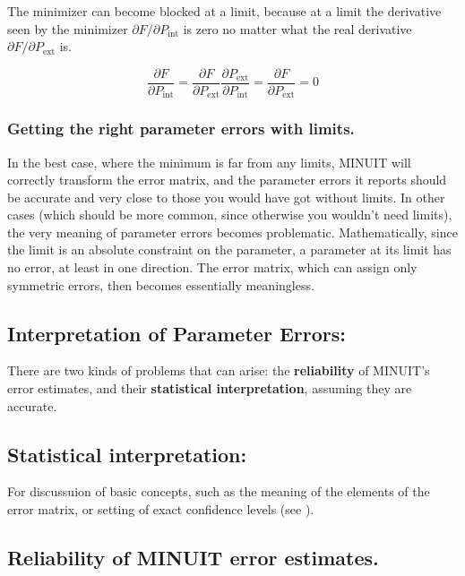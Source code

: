 The minimizer can become blocked at a limit, because at a limit
the derivative seen by the minimizer 
$\partial F / \partial P_{\mathrm{int}}$
is zero no matter what the real derivative
$\partial F / \partial P_{\mathrm{ext}}$ is.

\[
\frac{\partial F}{\partial P_{\mathrm{int}}}                =
\frac{\partial F}{\partial P_{\mathrm{ext}}}
\frac{\partial P_{\mathrm{ext}}}{\partial P_{\mathrm{int}}} =
\frac{\partial F}{\partial P_{\mathrm{ext}}}                = 0
\]

\subsubsection*{Getting the right parameter errors with limits.}


In the best case, where the minimum is far from any limits,
MINUIT will correctly transform the error matrix, and the
parameter errors it reports should be accurate and very
close to those you would have got without limits.
In other cases (which should be more common, since
otherwise you wouldn't need limits), the very meaning of
parameter errors becomes problematic.  
Mathematically, since
the limit is an absolute constraint on the parameter, a parameter
at its limit has no error, at least in one direction.
The error matrix, which can assign only symmetric errors, then
becomes essentially meaningless.

\subsection{Interpretation of Parameter Errors:}

There are two kinds of problems that can arise:
the {\bf reliability} of MINUIT's error estimates, and their
{\bf statistical interpretation}, assuming they are accurate.

\subsection*{Statistical interpretation:}

For discussuion of basic concepts, such as the meaning of the elements
of the error matrix, or setting of exact confidence levels (see \cite{bib-EADIE}).

\subsection*{Reliability of MINUIT error estimates.}

